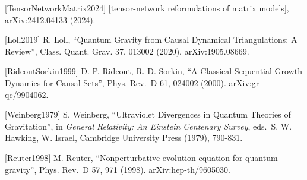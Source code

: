 \documentclass[
]{article}
\begin{document}
{[}TensorNetworkMatrix2024{]} {[}tensor-network reformulations of matrix
models{]}, arXiv:2412.04133 (2024).

{[}Loll2019{]} R. Loll, ``Quantum Gravity from Causal Dynamical
Triangulations: A Review'', Class. Quant. Grav. 37, 013002 (2020).
arXiv:1905.08669.

{[}RideoutSorkin1999{]} D. P. Rideout, R. D. Sorkin, ``A Classical
Sequential Growth Dynamics for Causal Sets'', Phys. Rev.~D 61, 024002
(2000). arXiv:gr-qc/9904062.

{[}Weinberg1979{]} S. Weinberg, ``Ultraviolet Divergences in Quantum
Theories of Gravitation'', in \emph{General Relativity: An Einstein
Centenary Survey}, eds.~S. W. Hawking, W. Israel, Cambridge University
Press (1979), 790-831.

{[}Reuter1998{]} M. Reuter, ``Nonperturbative evolution equation for
quantum gravity'', Phys. Rev.~D 57, 971 (1998). arXiv:hep-th/9605030.
\end{document}
